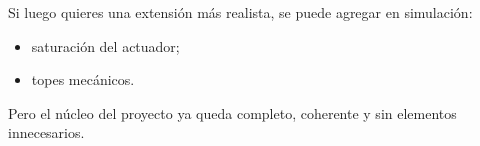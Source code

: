 \documentclass[11pt]{article}
\begin{document}
Si luego quieres una extensi\'on m\'as realista, se puede agregar en simulaci\'on:

\begin{itemize}[leftmargin=1.2cm]
\item saturaci\'on del actuador;
\item topes mec\'anicos.
\end{itemize}

Pero el n\'ucleo del proyecto ya queda completo, coherente y sin elementos innecesarios.
\end{document}
